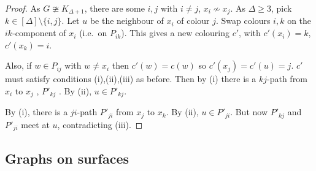 \documentclass{article}
\begin{document}
\begin{proof}
    As $G \ncong K_{\Delta+1}$, there are some $i, j$ with $i \neq j$, $x_i \nsim x_j$.
    As $\Delta \geq 3$, pick $k \in [\Delta] \setminus \{i, j\}$.
    Let $u$ be the neighbour of $x_i$ of colour $j$.
    Swap colours $i,k$ on the $ik$-component of $x_i$ (i.e.\ on $P_{ik}$).
    This gives a new colouring $c'$, with $c'(x_i) = k$, $c'(x_k) = i$.

    Also, if $w \in P_{ij}$ with $w \neq x_i$ then $c'(w) = c(w)$ so $c'(x_j)=c'(u) = j$.
    $c'$ must satisfy conditions (i),(ii),(iii) as before.
    Then by (i) there is a $kj$-path from $x_i$ to $x_j$ , $P'_{kj}$ .
    By (ii), $u \in P'_{kj}$.

    By (i), there is a $ji$-path $P'_{ji}$ from $x_j$ to $x_k$.
    By (ii), $u \in P'_{ji}$.
    But now $P'_{kj}$ and $P'_{ji}$ meet at $u$, contradicting (iii).
\end{proof}
\subsection{Graphs on surfaces}
\end{document}
